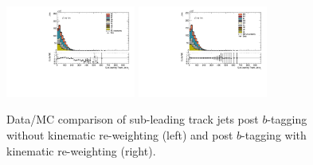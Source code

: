 \begin{figure}[htbp]
  \centering
\includegraphics[width=0.38\textwidth]{figures/gbb/SubLeadTrkJet_pT_PreReweight.pdf}
 \includegraphics[width=0.38\textwidth]{figures/gbb/SubLeadTrkJet_pT_Reweight.pdf}
\caption{Data/MC comparison of sub-leading track jets \pt post $b$-tagging without kinematic re-weighting (left) and post $b$-tagging with kinematic re-weighting (right).}%
  \label{fig:gbb-pT_subtrkjets}
\end{figure}
